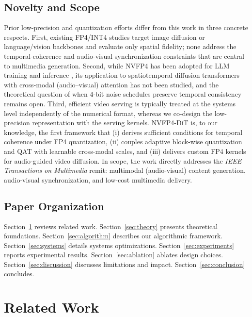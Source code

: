 \documentclass[journal,twoside]{IEEEtran}
\theoremstyle{definition}
\theoremstyle{remark}
\begin{document}
\subsection{Novelty and Scope}
Prior low-precision and quantization efforts differ from this work in three concrete respects. First, existing FP4/INT4 studies target image diffusion or language/vision backbones \cite{zhao2023fp4, li2023efficientdm, bondarenko2024understanding} and evaluate only spatial fidelity; none address the temporal-coherence and audio-visual synchronization constraints that are central to multimedia generation. Second, while NVFP4 has been adopted for LLM training and inference \cite{nvidia2024nvfp4, dettmers2023qlora}, its application to spatiotemporal diffusion transformers with cross-modal (audio--visual) attention has not been studied, and the theoretical question of when 4-bit noise schedules preserve temporal consistency remains open. Third, efficient video serving is typically treated at the systems level \cite{kwon2023efficient, nvidia2024tensorrt} independently of the numerical format, whereas we co-design the low-precision representation with the serving kernels. NVFP4-DiT is, to our knowledge, the first framework that (i) derives sufficient conditions for temporal coherence under FP4 quantization, (ii) couples adaptive block-wise quantization and QAT with learnable cross-modal scales, and (iii) delivers custom FP4 kernels for audio-guided video diffusion. In scope, the work directly addresses the \textit{IEEE Transactions on Multimedia} remit: multimodal (audio-visual) content generation, audio-visual synchronization, and low-cost multimedia delivery.

\subsection{Paper Organization}
Section~\ref{sec:related} reviews related work. Section~\ref{sec:theory} presents theoretical foundations. Section~\ref{sec:algorithm} describes our algorithmic framework. Section~\ref{sec:systems} details systems optimizations. Section~\ref{sec:experiments} reports experimental results. Section~\ref{sec:ablation} ablates design choices. Section~\ref{sec:discussion} discusses limitations and impact. Section~\ref{sec:conclusion} concludes.

\section{Related Work}
\label{sec:related}
\end{document}
